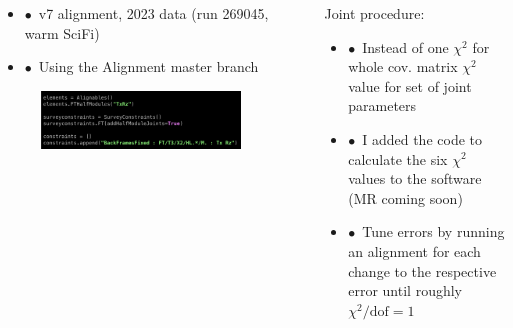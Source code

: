 \documentclass[aspectratio=1610, 12pt]{beamer}
\begin{document}
\begin{frame}
  \begin{columns}
    \begin{column}[c]{0.48\textwidth}
      \begin{itemize}
        \item $\bullet$\, v7 alignment, 2023 data (run 269045, warm SciFi)
        \item $\bullet$\, Using the Alignment master branch
      \end{itemize}
      \begin{figure}
        \includegraphics[width=0.9\textwidth]{plots/config_joint_constraint.png}
      \end{figure}
    \end{column}
    \begin{column}[c]{0.48\textwidth}
      Joint procedure:
      \begin{itemize}
        \item $\bullet$\, Instead of one $\chi^2$ for whole cov. matrix \to $\chi^2$ value for set of joint parameters
        \item $\bullet$\, I added the code to calculate the six $\chi^2$ values to the software (MR coming soon)
        \item $\bullet$\, Tune errors by running an alignment for each change to the respective error until roughly $\chi^2 / \text{dof} = 1$ 
      \end{itemize}
    \end{column}
  \end{columns}
\end{frame}
\end{document}
